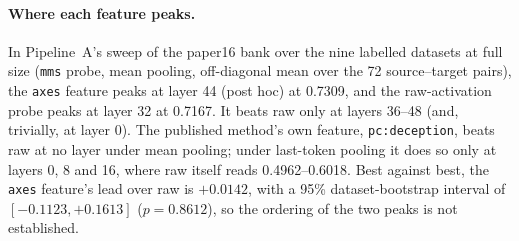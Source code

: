 \paragraph{Where each feature peaks.}
In Pipeline~A's sweep of the paper16 bank over the nine labelled datasets at full size (\texttt{mms} probe, mean pooling, off-diagonal mean over the 72 source--target pairs), the \texttt{axes} feature peaks at layer 44 (post hoc) at 0.7309, and the raw-activation probe peaks at layer 32 at 0.7167. %
It beats raw only at layers 36--48 (and, trivially, at layer 0). %
The published method's own feature, \texttt{pc:deception}, beats raw at no layer under mean pooling; under last-token pooling it does so only at layers 0, 8 and 16, where raw itself reads 0.4962--0.6018. %
Best against best, the \texttt{axes} feature's lead over raw is $+0.0142$, with a 95\% dataset-bootstrap interval of $[-0.1123, +0.1613]$ ($p=0.8612$), so the ordering of the two peaks is not established. %

